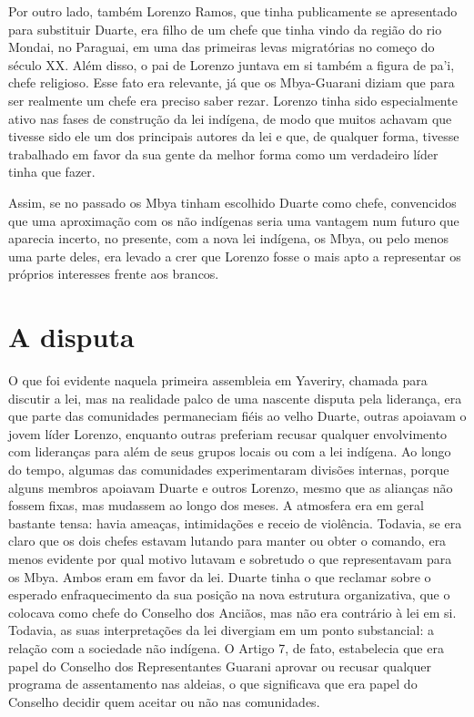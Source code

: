 Por outro lado, também Lorenzo Ramos, que tinha publicamente se
apresentado para substituir Duarte, era filho de um chefe que tinha
vindo da região do rio Mondai, no Paraguai, em uma das primeiras levas
migratórias no começo do século XX. Além disso, o pai de Lorenzo
juntava em si também a figura de pa’i, chefe religioso. Esse fato era
relevante, já que os Mbya-Guarani diziam que para ser realmente um
chefe era preciso saber rezar. Lorenzo tinha sido especialmente ativo
nas fases de construção da lei indígena, de modo que muitos achavam que
tivesse sido ele um dos principais autores da lei e que, de qualquer
forma, tivesse trabalhado em favor da sua gente da melhor forma como um
verdadeiro líder tinha que fazer.

Assim, se no passado os Mbya tinham escolhido Duarte como chefe,
convencidos que uma aproximação com os não indígenas seria uma vantagem
num futuro que aparecia incerto, no presente, com a nova lei indígena,
os Mbya, ou pelo menos uma parte deles, era levado a crer que Lorenzo
fosse o mais apto a representar os próprios interesses frente aos
brancos.

\section{A disputa}

O que foi evidente naquela primeira assembleia em Yaveriry, chamada para
discutir a lei, mas na realidade palco de uma nascente disputa pela
liderança, era que parte das comunidades permaneciam fiéis ao velho
Duarte, outras apoiavam o jovem líder Lorenzo, enquanto outras
preferiam recusar qualquer envolvimento com lideranças para além de
seus grupos locais ou com a lei indígena. Ao longo do tempo, algumas
das comunidades experimentaram divisões internas, porque alguns membros
apoiavam Duarte e outros Lorenzo, mesmo que as alianças não fossem
fixas, mas mudassem ao longo dos meses. A atmosfera era em geral
bastante tensa: havia ameaças, intimidações e receio de violência.
Todavia, se era claro que os dois chefes estavam lutando para manter ou
obter o comando, era menos evidente por qual motivo lutavam e sobretudo
o que representavam para os Mbya. Ambos eram em favor da lei. Duarte
tinha o que reclamar sobre o esperado enfraquecimento da sua posição na
nova estrutura organizativa, que o colocava como chefe do Conselho dos
Anciãos, mas não era contrário à lei em si. Todavia, as suas
interpretações da lei divergiam em um ponto substancial: a relação com
a sociedade não indígena. O Artigo 7, de fato, estabelecia que era
papel do Conselho dos Representantes Guarani aprovar ou recusar
qualquer programa de assentamento nas aldeias, o que significava que
era papel do Conselho decidir quem aceitar ou não nas comunidades.

